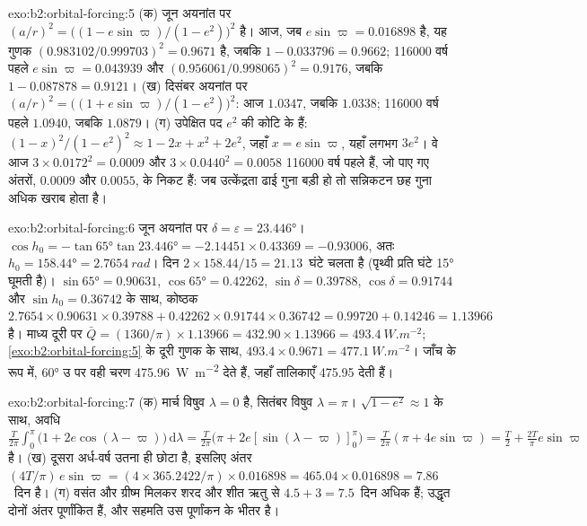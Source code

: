 \begin{solution}{exo:b2:orbital-forcing:5}
(क) जून अयनांत पर $(a/r)^2 = \bigl((1 - e\sin\varpi)/(1 - e^2)\bigr)^2$ है। आज, जब $e\sin\varpi
= 0.016898$ है, यह गुणक $(0.983102/0.999703)^2 = 0.9671$ है, जबकि $1 - 0.033796 = 0.9662$;
\num{116000} वर्ष पहले $e\sin\varpi = 0.043939$ और $(0.956061/0.998065)^2 = 0.9176$, जबकि $1 -
0.087878 = 0.9121$। (ख) दिसंबर अयनांत पर $(a/r)^2 = \bigl((1 + e\sin\varpi)/(1 -
e^2)\bigr)^2$: आज $1.0347$, जबकि $1.0338$; \num{116000} वर्ष पहले $1.0940$, जबकि $1.0879$।
(ग) उपेक्षित पद $e^2$ की कोटि के हैं: $(1 - x)^2/(1 - e^2)^2 \approx 1 - 2x + x^2 + 2e^2$,
जहाँ $x = e\sin\varpi$, यहाँ लगभग $3e^2$। वे आज $3 \times 0.0172^2 = 0.0009$ और $3
\times 0.0440^2 = 0.0058$ \num{116000} वर्ष पहले हैं, जो पाए गए अंतरों, $0.0009$ और
$0.0055$, के निकट हैं: जब उत्केंद्रता ढाई गुना
बड़ी हो तो सन्निकटन छह गुना अधिक खराब होता है।
\end{solution}

\begin{solution}{exo:b2:orbital-forcing:6}
जून अयनांत पर $\delta = \varepsilon = \ang{23.446}$। $\cos h_0 = -\tan\ang{65}\tan\ang{23.446}
= -2.14451 \times 0.43369 = -0.93006$, अतः $h_0 = \ang{158.44} = \qty{2.7654}{rad}$। दिन
$2 \times 158.44/15 = 21.13$~घंटे चलता है (पृथ्वी प्रति घंटे \ang{15} घूमती है)। $\sin\ang{65} = 0.90631$,
$\cos\ang{65} = 0.42262$, $\sin\delta = 0.39788$, $\cos\delta = 0.91744$ और $\sin h_0 = 0.36742$ के साथ,
कोष्ठक $2.7654 \times 0.90631 \times 0.39788 + 0.42262 \times 0.91744 \times 0.36742 = 0.99720
+ 0.14246 = 1.13966$ है। माध्य दूरी पर $\bar Q = (1360/\pi) \times 1.13966 = 432.90 \times 1.13966
= \qty{493.4}{W.m^{-2}}$; \cref{exo:b2:orbital-forcing:5} के दूरी गुणक के साथ, $493.4 \times
0.9671 = \qty{477.1}{W.m^{-2}}$। जाँच के रूप में, \ang{60} उ पर वही चरण \qty{475.96}{W.m^{-2}} देते हैं, जहाँ तालिकाएँ \num{475.95} देती हैं।
\end{solution}

\begin{solution}{exo:b2:orbital-forcing:7}
(क) मार्च विषुव $\lambda = 0$ है, सितंबर विषुव $\lambda = \pi$। $\sqrt{1 - e^2}
\approx 1$ के साथ, अवधि $\frac{T}{2\pi}\int_0^{\pi}\bigl(1 + 2e\cos(\lambda -
\varpi)\bigr)\,\mathrm d\lambda = \frac{T}{2\pi}\bigl(\pi + 2e[\sin(\lambda - \varpi)]_0^{\pi}\bigr)
= \frac{T}{2\pi}(\pi + 4e\sin\varpi) = \frac T2 + \frac{2T}{\pi}e\sin\varpi$ है। (ख) दूसरा अर्ध-वर्ष
उतना ही छोटा है, इसलिए अंतर $(4T/\pi)\,e\sin\varpi = (4 \times
365.2422/\pi) \times 0.016898 = 465.04 \times 0.016898 = 7.86$~दिन है। (ग) वसंत और ग्रीष्म मिलकर
शरद और शीत ऋतु से $4.5 + 3 = 7.5$~दिन अधिक हैं; उद्धृत दोनों अंतर पूर्णांकित हैं, और
सहमति उस पूर्णांकन के भीतर है।
\end{solution}

